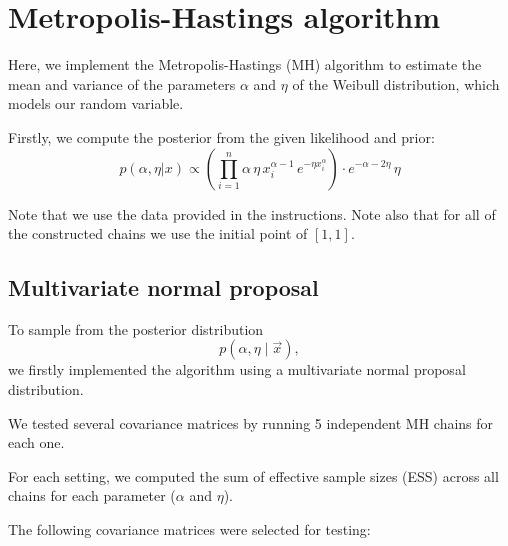 \documentclass[9pt]{IEEEtran}
\begin{document}
\section{Metropolis-Hastings algorithm}
Here, we implement the Metropolis-Hastings (MH) algorithm to estimate the mean and variance of the parameters \(\alpha\) and \(\eta\) of the Weibull distribution, which models our random variable.


Firstly, we compute the posterior from the given likelihood and prior: 
\[
p(\alpha, \eta | x) \propto \left( \prod_{i=1}^{n} \alpha \, \eta \, x_i^{\alpha - 1} \, e^{-\eta x_i^\alpha} \right) \cdot e^{-\alpha - 2 \eta} \, \eta
\]

Note that we use the data provided in the instructions. Note also that for 
all of the constructed chains we use the initial point of $[1, 1]$.

\subsection{Multivariate normal proposal}
To sample from the posterior distribution 
\[
p(\alpha, \eta \mid \vec{x}),
\]
we firstly implemented the algorithm using a multivariate normal proposal distribution.

We tested several covariance matrices
by running 5 independent MH chains for each one.

For each setting, we computed the sum of effective sample sizes (ESS) across all chains
 for each parameter (\( \alpha \) and \( \eta \)).

\vspace{1em}

The following covariance matrices were selected for testing:
\end{document}
